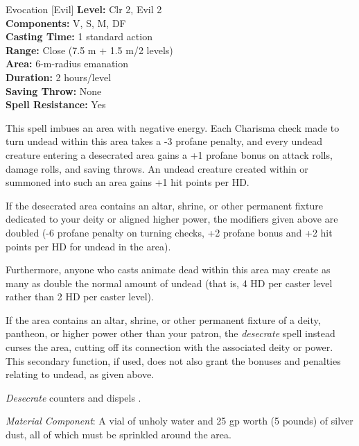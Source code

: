 {Evocation [Evil]}
{
	\textbf{Level:}
	Clr 2, Evil 2\\
	\textbf{Components:}
	V, S, M, DF\\
	\textbf{Casting Time:}
	1 standard action\\
	\textbf{Range:}
	Close (7.5 m + 1.5 m/2 levels)\\
	\textbf{Area:}
	6-m-radius emanation\\
	\textbf{Duration:}
	2 hours/level\\
	\textbf{Saving Throw:}
	None\\
	\textbf{Spell Resistance:}
	Yes\\
}
{
	This spell imbues an area with negative energy. Each Charisma check made to turn undead within this area takes a -3 profane penalty, and every undead creature entering a desecrated area gains a +1 profane bonus on attack rolls, damage rolls, and saving throws. An undead creature created within or summoned into such an area gains +1 hit points per HD.

	If the desecrated area contains an altar, shrine, or other permanent fixture dedicated to your deity or aligned higher power, the modifiers given above are doubled (-6 profane penalty on turning checks, +2 profane bonus and +2 hit points per HD for undead in the area).

	Furthermore, anyone who casts animate dead within this area may create as many as double the normal amount of undead (that is, 4 HD per caster level rather than 2 HD per caster level).

	If the area contains an altar, shrine, or other permanent fixture of a deity, pantheon, or higher power other than your patron, the \emph{desecrate} spell instead curses the area, cutting off its connection with the associated deity or power. This secondary function, if used, does not also grant the bonuses and penalties relating to undead, as given above.

	\emph{Desecrate} counters and dispels .

	\textit{Material Component}:
	A vial of unholy water and 25 gp worth (5 pounds) of silver dust, all of which must be sprinkled around the area.

}
